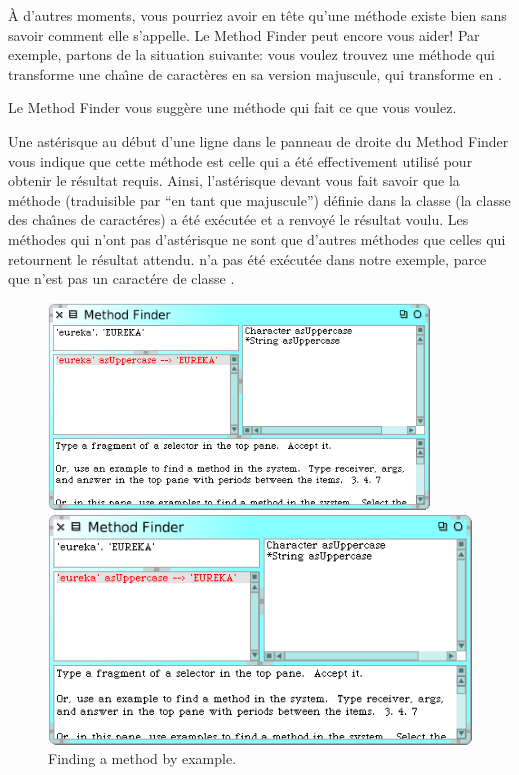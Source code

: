 \documentclass[a4paper,10pt,twoside]{book}
\begin{document}
\`A d'autres moments, vous pourriez avoir en t\^ete qu'une m\'ethode
existe bien sans savoir comment elle s'appelle.
Le Method Finder peut encore vous aider! Par exemple, partons de la
situation suivante: vous voulez trouvez une m\'ethode qui transforme
une cha\^{\i}ne de caract\`eres en sa version majuscule, \cad qui
transforme  en .

\noindent
Le Method Finder vous sugg\`ere une m\'ethode qui fait ce
que vous voulez.

Une ast\'erisque au d\'ebut d'une ligne dans le panneau de droite du
Method Finder vous indique que cette m\'ethode est celle qui a \'et\'e
effectivement utilis\'e pour obtenir le r\'esultat requis.
Ainsi, l'ast\'erisque devant  vous fait savoir
que la m\'ethode  
(traduisible par ``en tant que majuscule'')
d\'efinie dans la classe  
(la classe des cha\^{\i}nes de caract\'eres)
a \'et\'e ex\'ecut\'ee et a renvoy\'e le r\'esultat voulu.
Les m\'ethodes qui n'ont pas d'ast\'erisque ne sont que d'autres
m\'ethodes que celles qui retournent le r\'esultat attendu.
 n'a pas \'et\'e ex\'ecut\'ee dans notre
exemple, parce que  n'est pas un caract\'ere de classe .

\begin{figure}[hbt]
\ifluluelse
	{\centerline {\includegraphics[width=0.9\textwidth]{MethodFinder-example1}}}
	{\centerline {\includegraphics[scale=0.7]{MethodFinder-example1}}}
\caption{Finding a method by example.
\label{fig:methodFinder-example1}}
\end{figure}
\end{document}
